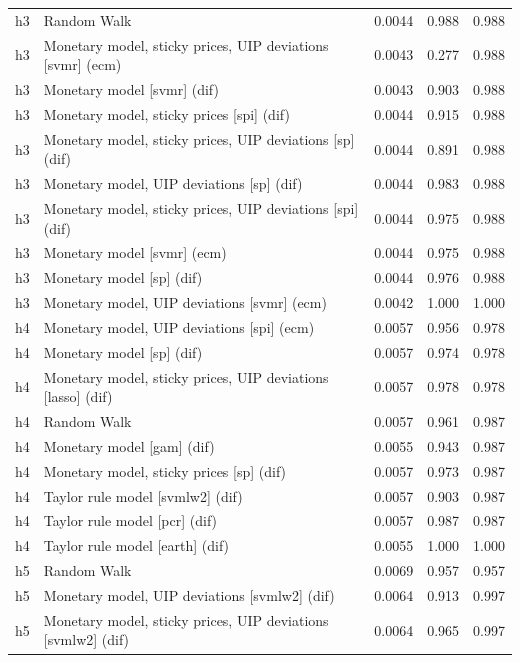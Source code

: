 \begin{ThreePartTable}
\begin{longtable}[t]{cp{5.5cm}ccc}
h3 & \raggedright Random Walk & 0.0044 & 0.988 & 0.988\\
h3 & \raggedright Monetary model, sticky prices, UIP deviations [svmr] (ecm) & 0.0043 & 0.277 & 0.988\\
h3 & \raggedright Monetary model [svmr] (dif) & 0.0043 & 0.903 & 0.988\\
h3 & \raggedright Monetary model, sticky prices [spi] (dif) & 0.0044 & 0.915 & 0.988\\
h3 & \raggedright Monetary model, sticky prices, UIP deviations [sp] (dif) & 0.0044 & 0.891 & 0.988\\
h3 & \raggedright Monetary model, UIP deviations [sp] (dif) & 0.0044 & 0.983 & 0.988\\
h3 & \raggedright Monetary model, sticky prices, UIP deviations [spi] (dif) & 0.0044 & 0.975 & 0.988\\
h3 & \raggedright Monetary model [svmr] (ecm) & 0.0044 & 0.975 & 0.988\\
h3 & \raggedright Monetary model [sp] (dif) & 0.0044 & 0.976 & 0.988\\
h3 & \raggedright Monetary model, UIP deviations [svmr] (ecm) & 0.0042 & 1.000 & 1.000\\
\addlinespace
h4 & \raggedright Monetary model, UIP deviations [spi] (ecm) & 0.0057 & 0.956 & 0.978\\
h4 & \raggedright Monetary model [sp] (dif) & 0.0057 & 0.974 & 0.978\\
h4 & \raggedright Monetary model, sticky prices, UIP deviations [lasso] (dif) & 0.0057 & 0.978 & 0.978\\
h4 & \raggedright Random Walk & 0.0057 & 0.961 & 0.987\\
h4 & \raggedright Monetary model [gam] (dif) & 0.0055 & 0.943 & 0.987\\
h4 & \raggedright Monetary model, sticky prices [sp] (dif) & 0.0057 & 0.973 & 0.987\\
h4 & \raggedright Taylor rule model [svmlw2] (dif) & 0.0057 & 0.903 & 0.987\\
h4 & \raggedright Taylor rule model [pcr] (dif) & 0.0057 & 0.987 & 0.987\\
h4 & \raggedright Taylor rule model [earth] (dif) & 0.0055 & 1.000 & 1.000\\
\addlinespace
h5 & \raggedright Random Walk & 0.0069 & 0.957 & 0.957\\
h5 & \raggedright Monetary model, UIP deviations [svmlw2] (dif) & 0.0064 & 0.913 & 0.997\\
h5 & \raggedright Monetary model, sticky prices, UIP deviations [svmlw2] (dif) & 0.0064 & 0.965 & 0.997\\

\end{longtable}
\end{ThreePartTable}
